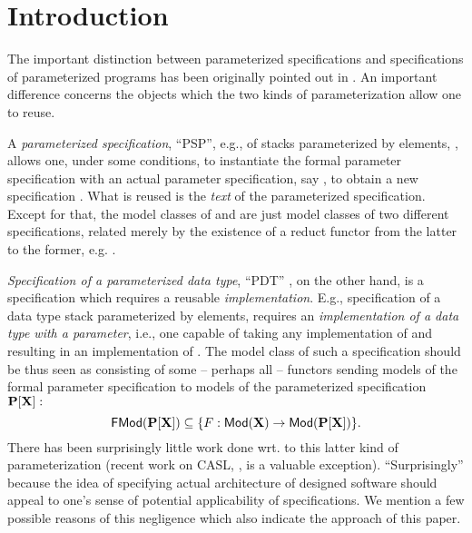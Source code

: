 \section{Introduction}
The important distinction between parameterized specifications and specifications
of parameterized programs has been originally pointed out in \cite{para}. An 
important difference concerns the objects which the two kinds of parameterization
allow one to reuse. 

A {\em parameterized specification}, ``PSP'', e.g., of stacks parameterized
by elements, , allows
one, under some conditions, to instantiate
the formal parameter specification  with an actual parameter specification, say , to
obtain a new specification . What is reused is the {\em text} of
the parameterized specification. Except for that, the model classes of 
and  are just model
classes of two different specifications, related merely by the existence of a
reduct functor from the latter to the former, 
e.g. \cite{Alge}.

{\em Specification of a parameterized data type}, ``PDT'' \cite{para1,para}, on the other hand, is a
specification which requires a reusable {\em implementation}. E.g.,
specification of a data type stack parameterized by elements, 
requires an {\em implementation of a data type with a parameter}, i.e., one capable
of taking any implementation of  and resulting in an implementation of
. The model class of such a specification should be thus seen as
consisting of some -- perhaps all -- functors sending models of the formal
parameter specification  to models of the parameterized specification ${\bf P[X]}:$
\begin{equation}
{\sf {FMod}}({\bf P[X]}) \subseteq \{F:{\sf {Mod}}({\bf X})\to{\sf {Mod}}({\bf P[X]})\}. \label{eq:fsem}
\end{equation}
There has been surprisingly little work done wrt. to this latter kind of
parameterization (recent work on CASL, \cite{CASL}, is a valuable exception). ``Surprisingly'' because the idea of specifying actual
architecture of designed software should appeal to one's sense of potential
applicability of specifications. 
We mention a few possible reasons of this negligence which also indicate the
approach of this paper.

